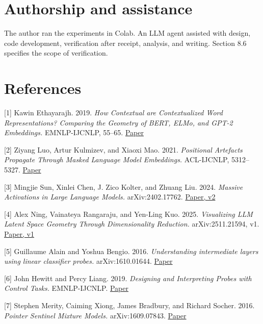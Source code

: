 \FloatBarrier

\section{Authorship and assistance}\label{authorship-and-assistance}

The author ran the experiments in Colab. An LLM agent assisted with design, code development, verification after receipt, analysis, and writing. Section 8.6 specifies the scope of verification.

\FloatBarrier

\section{References}\label{references}

{[}1{]} Kawin Ethayarajh. 2019. \emph{How Contextual are Contextualized Word Representations? Comparing the Geometry of BERT, ELMo, and GPT-2 Embeddings.} EMNLP-IJCNLP, 55--65. \href{https://aclanthology.org/D19-1006/}{Paper}

{[}2{]} Ziyang Luo, Artur Kulmizev, and Xiaoxi Mao. 2021. \emph{Positional Artefacts Propagate Through Masked Language Model Embeddings.} ACL-IJCNLP, 5312--5327. \href{https://aclanthology.org/2021.acl-long.413/}{Paper}

{[}3{]} Mingjie Sun, Xinlei Chen, J. Zico Kolter, and Zhuang Liu. 2024. \emph{Massive Activations in Large Language Models.} arXiv:2402.17762. \href{https://arxiv.org/html/2402.17762v2}{Paper, v2}

{[}4{]} Alex Ning, Vainateya Rangaraju, and Yen-Ling Kuo. 2025. \emph{Visualizing LLM Latent Space Geometry Through Dimensionality Reduction.} arXiv:2511.21594, v1. \href{https://arxiv.org/html/2511.21594v1}{Paper, v1}

{[}5{]} Guillaume Alain and Yoshua Bengio. 2016. \emph{Understanding intermediate layers using linear classifier probes.} arXiv:1610.01644. \href{https://arxiv.org/abs/1610.01644}{Paper}

{[}6{]} John Hewitt and Percy Liang. 2019. \emph{Designing and Interpreting Probes with Control Tasks.} EMNLP-IJCNLP. \href{https://aclanthology.org/D19-1275/}{Paper}

{[}7{]} Stephen Merity, Caiming Xiong, James Bradbury, and Richard Socher. 2016. \emph{Pointer Sentinel Mixture Models.} arXiv:1609.07843. \href{https://arxiv.org/abs/1609.07843}{Paper}



\FloatBarrier

